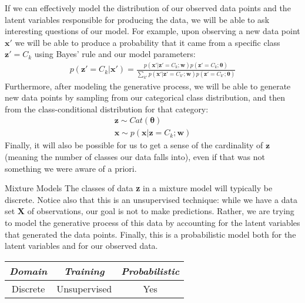 If we can effectively model the distribution of our observed data points and the latent variables responsible for producing the data, we will be able to ask interesting questions of our model. For example, upon observing a new data point $\textbf{x}'$ we will be able to produce a probability that it came from a specific class $\textbf{z}' = C_k$ using Bayes' rule and our model parameters:
\begin{align*}
    p(\textbf{z}' = C_k | \textbf{x}') = \frac{p(\textbf{x}' | \textbf{z}' = C_{k}; \textbf{w})p(\textbf{z}' = C_{k} ; \boldsymbol{\theta})}{\sum_{k'} p(\textbf{x}' | \textbf{z}' = C_{k'}; \textbf{w})p(\textbf{z}' = C_{k'} ; \boldsymbol{\theta})}
\end{align*}
Furthermore, after modeling the generative process, we will be able to generate new data points by sampling from our categorical class distribution, and then from the class-conditional distribution for that category:
\begin{align*}
    \textbf{z} \sim Cat(\boldsymbol{\theta}) \\
    \textbf{x} \sim p(\textbf{x} | \textbf{z} = C_{k}; \textbf{w})
\end{align*}
Finally, it will also be possible for us to get a sense of the cardinality of $\textbf{z}$ (meaning the number of classes our data falls into), even if that was not something we were aware of a priori.

\begin{mlcube}{Mixture Models}
The classes of data \textbf{z} in a mixture model will typically be discrete. Notice also that this is an unsupervised technique: while we have a data set $\textbf{X}$ of observations, our goal is not to make predictions. Rather, we are trying to model the generative process of this data by accounting for the latent variables that generated the data points. Finally, this is a probabilistic model both for the latent variables and for our observed data.
\begin{center}
    \begin{tabular}{c|c|c}
    \textit{\textbf{Domain}} & \textit{\textbf{Training}} & \textit{\textbf{Probabilistic}} \\
    \hline
    Discrete & Unsupervised & Yes \\
    \end{tabular}
\end{center}
\end{mlcube}

